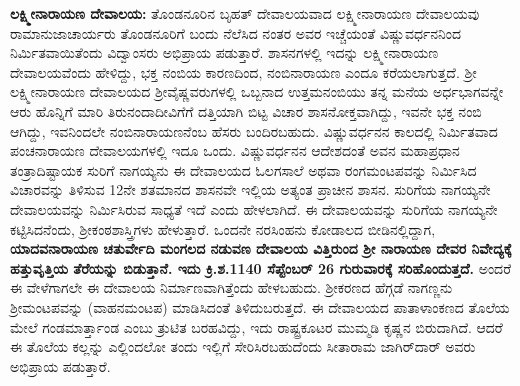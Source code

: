 \textbf{ಲಕ್ಷ್ಮೀನಾರಾಯಣ ದೇವಾಲಯ:} ತೊಂಡನೂರಿನ ಬೃಹತ್​ ದೇವಾಲಯವಾದ ಲಕ್ಷ್ಮೀನಾರಾಯಣ ದೇವಾಲಯವು ರಾಮಾನುಜಾಚಾರ್ಯರು ತೊಂಡನೂರಿಗೆ ಬಂದು ನೆಲೆಸಿದ ನಂತರ ಅವರ ಇಚ್ಚೆಯಂತೆ ವಿಷ್ಣುವರ್ಧನನಿಂದ ನಿರ್ಮಿತವಾಯಿತೆಂದು ವಿದ್ವಾಂಸರು ಅಭಿಪ್ರಾಯ ಪಡುತ್ತಾರೆ. ಶಾಸನಗಳಲ್ಲಿ ಇದನ್ನು ಲಕ್ಷ್ಮೀನಾರಾಯಣ ದೇವಾಲಯವೆಂದು ಹೇಳಿದ್ದು, ಭಕ್ತ ನಂಬಿಯ ಕಾರಣದಿಂದ, ನಂಬಿನಾರಾಯಣ ಎಂದೂ ಕರೆಯಲಾಗುತ್ತದೆ. ಶ‍್ರೀ ಲಕ್ಷ್ಮೀನಾರಾಯಣ ದೇವಾಲಯದ ಶ‍್ರೀವೈಷ್ಣವರುಗಳಲ್ಲಿ ಒಬ್ಬನಾದ ಉತ್ತಮನಂಬಿಯು ತನ್ನ ಮನೆಯ ಅರ್ಧಭಾಗವನ್ನೇ ಆರು ಹೊನ್ನಿಗೆ ಮಾರಿ ತಿರುನಂದಾದೀವಿಗೆಗೆ ದತ್ತಿಯಾಗಿ ಬಿಟ್ಟ ವಿಚಾರ ಶಾಸನೋಕ್ತವಾಗಿದ್ದು, ಇವನೇ ಭಕ್ತ ನಂಬಿ ಆಗಿದ್ದು, ಇವನಿಂದಲೇ ನಂಬಿನಾರಾಯಣನೆಂಬ ಹೆಸರು ಬಂದಿರಬಹುದು. ವಿಷ್ಣುವರ್ಧನನ ಕಾಲದಲ್ಲಿ ನಿರ್ಮಿತವಾದ ಪಂಚನಾರಾಯಣ ದೇವಾಲಯಗಳಲ್ಲಿ ಇದೂ ಒಂದು. ವಿಷ್ಣುವರ್ಧನನ ಆದೇಶದಂತೆ ಅವನ ಮಹಾಪ್ರಧಾನ ತಂತ್ರಾದಿಷ್ಟಾಯಕ ಸುರಿಗೆ ನಾಗಯ್ಯನು ಈ ದೇವಾಲಯದ ಓಲಗಸಾಲೆ ಅಥವಾ ರಂಗಮಂಟಪವನ್ನು ನಿರ್ಮಿಸಿದ ವಿಚಾರವನ್ನು ತಿಳಿಸುವ 12ನೇ ಶತಮಾನದ ಶಾಸನವೇ ಇಲ್ಲಿಯ ಅತ್ಯಂತ ಪ್ರಾಚೀನ ಶಾಸನ. ಸುರಿಗೆಯ ನಾಗಯ್ಯನೇ ದೇವಾಲಯವನ್ನು ನಿರ್ಮಿಸಿರುವ ಸಾಧ್ಯತೆ ಇದೆ ಎಂದು ಹೇಳಲಾಗಿದೆ. ಈ ದೇವಾಲಯವನ್ನು ಸುರಿಗೆಯ ನಾಗಯ್ಯನೇ ಕಟ್ಟಿಸಿದನೆಂದು, ಶ‍್ರೀಕಂಠಶಾಸ್ತ್ರಿಗಳು ಹೇಳುತ್ತಾರೆ. ಒಂದನೇ ನರಸಿಂಹನು ಕೋಡಾಲದ ಬೀಡಿನಲ್ಲಿದ್ದಾಗ, \textbf{ಯಾದವನಾರಾಯಣ ಚತುರ್ವೇದಿ ಮಂಗಲದ ನಡುವಣ ದೇವಾಲಯ ವಿತ್ತಿರುಂದ ಶ‍್ರೀ ನಾರಾಯಣ ದೇವರ ನಿವೇದ್ಯಕ್ಕೆ ಹತ್ತುವೃತ್ತಿಯ ತೆರೆಯನ್ನು ಬಿಡುತ್ತಾನೆ. ಇದು ಕ್ರಿ.ಶ.1140 ಸೆಪ್ಟೆಂಬರ್​ 26 ಗುರುವಾರಕ್ಕೆ ಸರಿಹೊಂದುತ್ತದೆ.} ಅಂದರೆ ಈ ವೇಳೆಗಾಗಲೇ ಈ ದೇವಾಲಯ ನಿರ್ಮಾಣವಾಗಿತ್ತೆಂದು ಹೇಳಬಹುದು. ಶ‍್ರೀಕರಣದ ಹೆಗ್ಗಡೆ ನಾಗಣ್ಣನು ಶ‍್ರೀಮಂಟಪವನ್ನು (ವಾಹನಮಂಟಪ) ಮಾಡಿಸಿದಂತೆ ತಿಳಿದುಬರುತ್ತದೆ. ಈ ದೇವಾಲಯದ ಪಾತಾಳಾಂಕಣದ ತೊಲೆಯ ಮೇಲೆ ಗಂಡಮಾರ್ತ್ತಾಂಡ ಎಂಬು ತ್ರುಟಿತ ಬರಹವಿದ್ದು, ಇದು ರಾಷ್ಟ್ರಕೂಟರ ಮುಮ್ಮಡಿ ಕೃಷ್ಣನ ಬಿರುದಾಗಿದೆ. ಆದರೆ ಈ ತೊಲೆಯ ಕಲ್ಲನ್ನು ಎಲ್ಲಿಂದಲೋ ತಂದು ಇಲ್ಲಿಗೆ ಸೇರಿಸಿರಬಹುದೆಂದು ಸೀತಾರಾಮ ಜಾಗಿರ್​ದಾರ್​ ಅವರು ಅಭಿಪ್ರಾಯ ಪಡುತ್ತಾರೆ.

